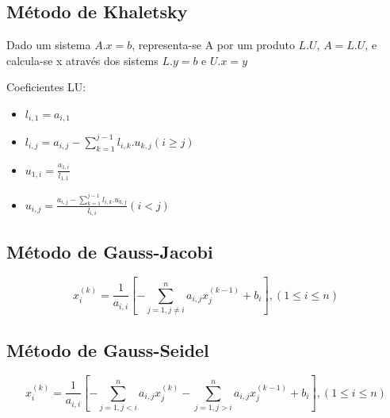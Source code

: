 \documentclass[../resumosMNUM.tex]{subfiles}
\begin{document}
\subsection{Método de Khaletsky}

Dado um sistema \(A.x = b\), representa-se A por um produto \(L.U\), \(A = L.U\), e calcula-se x através dos sistems \(L.y = b\) e \(U.x = y\)

Coeficientes LU:
\begin{itemize}
    \item \(l_{i,1} = a_{i,1}\)
    \item \(l_{i,j} = a_{i,j} - \sum_{k=1}^{j-1}l_{i,k}.u_{k,j} (i \geq j)\)
    \item \(u_{1,i} = \frac{a_{1,i}}{l_{1,1}}\)
    \item \(u_{i,j} = \frac{a_{i,j} - \sum_{k=1}^{j-1}l_{i,k}.u_{k,j}}{l_{i,i}} (i < j)\)
\end{itemize}

\subsection{Método de Gauss-Jacobi}

\[x_i^{(k)} = \frac{1}{a_{i,i}}[-\sum_{j=1,j\neq i}^n a_{i, j} x_j^{(k-1)} + b_i], (1 \leq i \leq n)\]


\subsection{Método de Gauss-Seidel}

\[x_i^{(k)} = \frac{1}{a_{i,i}}[-\sum_{j=1,j<i}^n a_{i, j} x_j^{(k)} -\sum_{j=1,j>i}^n a_{i, j} x_j^{(k-1)} + b_i], (1 \leq i \leq n)\]
\end{document}
